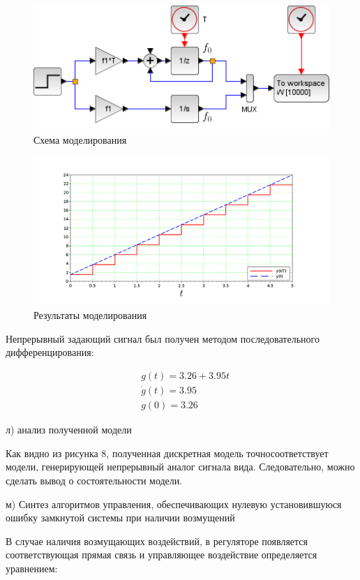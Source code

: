 \documentclass[a4paper,14pt]{extreport}
\begin{document}
\begin{figure}[H]
	\center\includegraphics[width=0.7\linewidth]{input_fsch.png}
	\caption{Схема моделирования}
	\label{fig:scr1}
\end{figure}
\begin{figure}[H]
	\center\includegraphics[width=1\linewidth]{input_f.png}
	\caption{Результаты моделирования }
	\label{fig:scr1}
\end{figure}

Непрерывный задающий сигнал был получен методом последовательного дифференцирования:

\begin{eqnarray}
	&g(t) = 3.26 + 3.95t\\
	&\dot g(t) = 3.95\\
	&g(0) = 3.26
\end{eqnarray}

л) анализ полученной модели

Как видно из рисунка 8, полученная дискретная модель точносоответствует модели, генерирующей непрерывный аналог сигнала вида.  Следовательно, можно сделать вывод о состоятельности модели.

м) Синтез алгоритмов управления, обеспечивающих нулевую установившуюся ошибку замкнутой системы при наличии возмущений

В случае наличия возмущающих воздействий, в регуляторе появляется соответствующая прямая связь и управляющее воздействие определяется уравнением:
\end{document}
